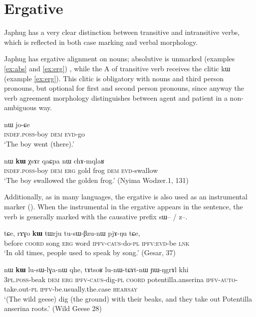 \documentclass[oldfontcommands,oneside,a4paper,11pt]{article}
\newcommand{\ipa}[1]{{\phon #1}} %
\begin{document}
\section{Ergative} \label{sec:erg}
Japhug has a very clear   distinction between transitive and intransitive verbs, which is reflected in both case marking and verbal morphology.

Japhug has ergative alignment on nouns; absolutive is unmarked (examples \ref{ex:abs} and \ref{ex:erg}) , while the A of transitive verb receives the clitic \ipa{kɯ} (example \ref{ex:erg}). This clitic is obligatory with nouns and third person pronouns, but optional for first and second person pronouns, since anyway the verb agreement morphology distinguishes between agent and patient in a non-ambiguous way.

\begin{exe}
\ex \label{ex:abs}
\gll \ipa{tɤ-tɕɯ}  	\ipa{nɯ}  	 	\ipa{jo-ɕe}   \\
\textsc{indef.poss}-boy \textsc{dem}   \textsc{evd}-go \\
\glt `The boy went (there).'
\end{exe}

\begin{exe}
\ex \label{ex:erg}
\gll \ipa{tɤ-tɕɯ}  	\ipa{nɯ}  	\ipa{\textbf{kɯ}} 	\ipa{χsɤr}  	\ipa{qaɕpa}  	\ipa{nɯ}  	\ipa{chɤ-mqlaʁ}   \\
\textsc{indef.poss}-boy \textsc{dem} \textsc{erg} gold frog \textsc{dem} \textsc{evd}-swallow \\
\glt `The boy swallowed the golden frog.' (Nyima Wodzer.1, 131)
\end{exe}


Additionally, as in many languages, the ergative is also used as an instrumental marker (\citealt[32]{agent02palancar}). When the instrumental in the ergative appears in the sentence, the verb is generally marked with the causative prefix \ipa{sɯ}-- / \ipa{z}--. 

\begin{exe}
\ex \label{ex:instr}
\gll \ipa{kɯɕɯŋgɯ}   	\ipa{tɕe,}   	\ipa{rɤɣo}   	\ipa{\textbf{kɯ}}   	\ipa{tɯrju}   	\ipa{tu-sɯ-βzu-nɯ}   	\ipa{pjɤ-ŋu}   	\ipa{tɕe,}     \\
before \textsc{coord} song \textsc{erg} word \textsc{ipfv}-\textsc{caus}-do-\textsc{pl} \textsc{ipfv:evd}-be \textsc{lnk}\\
\glt  `In old times, people used to speak by song.' (Gesar, 37)
\end{exe}
 \begin{exe}
\ex \label{ex:instr2}
\gll \ipa{nɯ-mtsioʁ}   	\ipa{nɯ}   	\ipa{\textbf{kɯ}}   	\ipa{lu-sɯ-lɣa-nɯ}   	\ipa{qhe,}   	\ipa{tɤtsoʁ}   	\ipa{lu-nɯ-tɕɤt-nɯ}   	\ipa{ɲɯ-ŋgrɤl}   	\ipa{khi}        \\
\textsc{3pl.poss}-beak \textsc{dem} \textsc{erg} \textsc{ipfv-caus}-dig-\textsc{pl} \textsc{coord} potentilla.anserina \textsc{ipfv-auto}-take.out-\textsc{pl} \textsc{ipfv}-be.usually.the.case \textsc{hearsay} \\
\glt  `(The wild geese) dig (the ground) with their beaks, and they take out Potentilla anserina roots.' (Wild Geese 28)
\end{exe}
\end{document}
